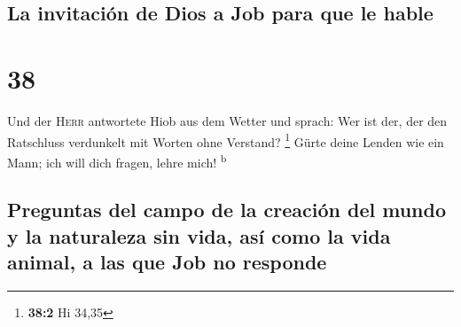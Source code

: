 \hypertarget{la-invitaciuxf3n-de-dios-a-job-para-que-le-hable}{%
\subsection{La invitación de Dios a Job para que le
hable}\label{la-invitaciuxf3n-de-dios-a-job-para-que-le-hable}}

\hypertarget{section-37}{%
\section{38}\label{section-37}}

 Und der \textsc{Herr} antwortete Hiob aus dem Wetter und
sprach:  Wer ist der, der den Ratschluss verdunkelt mit
Worten ohne Verstand? \footnote{\textbf{38:2} Hi 34,35} 
Gürte deine Lenden wie ein Mann; ich will dich fragen, lehre mich!
\textsuperscript{b}

\hypertarget{preguntas-del-campo-de-la-creaciuxf3n-del-mundo-y-la-naturaleza-sin-vida-asuxed-como-la-vida-animal-a-las-que-job-no-responde}{%
\subsection{Preguntas del campo de la creación del mundo y la naturaleza
sin vida, así como la vida animal, a las que Job no
responde}\label{preguntas-del-campo-de-la-creaciuxf3n-del-mundo-y-la-naturaleza-sin-vida-asuxed-como-la-vida-animal-a-las-que-job-no-responde}}

